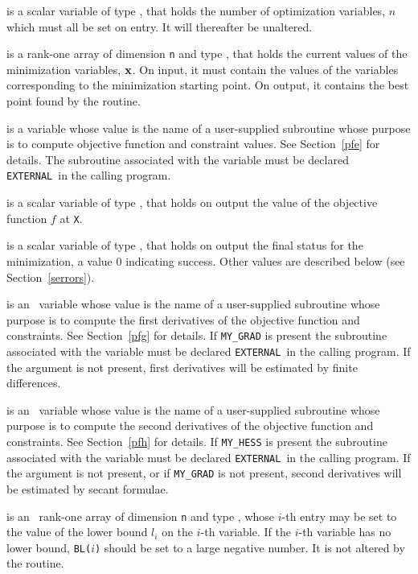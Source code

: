\documentclass{galahad}
\newcommand{\external}{{\tt EXTERNAL}}
\begin{document}
\begin{description}
 is a scalar variable of type \integer, that holds
the number of optimization variables, $n$ which must all be set on entry. It
will thereafter be unaltered.

 is a rank-one array of dimension {\tt n} and type
\realdp, that holds the current values of the
minimization variables, ${\mathbf{x}}$. On input, it must contain the values of the
variables corresponding to the minimization starting point.  On output, it
contains the best point found by the routine.

 is a variable whose value is the name of a
user-supplied subroutine whose purpose is to compute objective function
and constraint values. See Section~\ref{pfe} for details.
The subroutine associated with the variable must be declared \external\
in the calling program.

 is a scalar variable of type \realdp, that
holds  on output the value of the objective function $f$ at {\tt X}.

 is a scalar variable of type \integer, that holds
on output the final status for the minimization, a value 0 indicating
success.  Other values are described below (see Section~\ref{serrors}).

 is an \optional\ variable whose value is the name of a
user-supplied subroutine whose purpose is to compute the first derivatives
of the objective function and constraints. See Section~\ref{pfg} for details.
If {\tt MY\_GRAD} is present the subroutine associated with the variable must be
declared \external\ in the calling program. If the argument is not present,
first derivatives will be estimated by finite differences.

 is an \optional\ variable whose value is the name of a
user-supplied subroutine whose purpose is to compute the second derivatives
of the objective function and constraints. See Section~\ref{pfh} for details.
If {\tt MY\_HESS} is present the subroutine associated with the variable must be
declared \external\ in the calling program. If the argument is not present,
or if {\tt MY\_GRAD} is not present,
second derivatives will be estimated by secant formulae.

 is an \optional\ rank-one array of dimension {\tt n} and type
 \realdp, whose $i$-th entry may be set
to the value of the lower bound $l_i$ on the $i$-th variable.
If the $i$-th variable has no lower bound, {\tt BL($i$)} should be set to
a large negative number. It is not altered by the routine.


\end{description}
\end{document}
